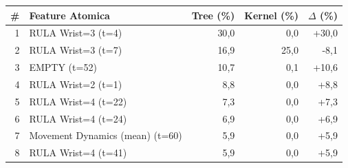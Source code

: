 \begin{tabular*}{\linewidth}{@{}r@{\extracolsep{\fill}}lrrr@{}}
\toprule
\textbf{\#} & \textbf{Feature Atomica} & \textbf{Tree (\%)} & \textbf{Kernel (\%)} & \textbf{$\Delta$ (\%)} \\
\midrule
1 & RULA Wrist=3 (t=4) & 30{,}0 & 0{,}0 & +30{,}0 \\
2 & RULA Wrist=3 (t=7) & 16{,}9 & 25{,}0 & -8{,}1 \\
3 & EMPTY (t=52) & 10{,}7 & 0{,}1 & +10{,}6 \\
4 & RULA Wrist=2 (t=1) & 8{,}8 & 0{,}0 & +8{,}8 \\
5 & RULA Wrist=4 (t=22) & 7{,}3 & 0{,}0 & +7{,}3 \\
6 & RULA Wrist=4 (t=24) & 6{,}9 & 0{,}0 & +6{,}9 \\
7 & Movement Dynamics (mean) (t=60) & 5{,}9 & 0{,}0 & +5{,}9 \\
8 & RULA Wrist=4 (t=41) & 5{,}9 & 0{,}0 & +5{,}9 \\
\bottomrule
\end{tabular*}
